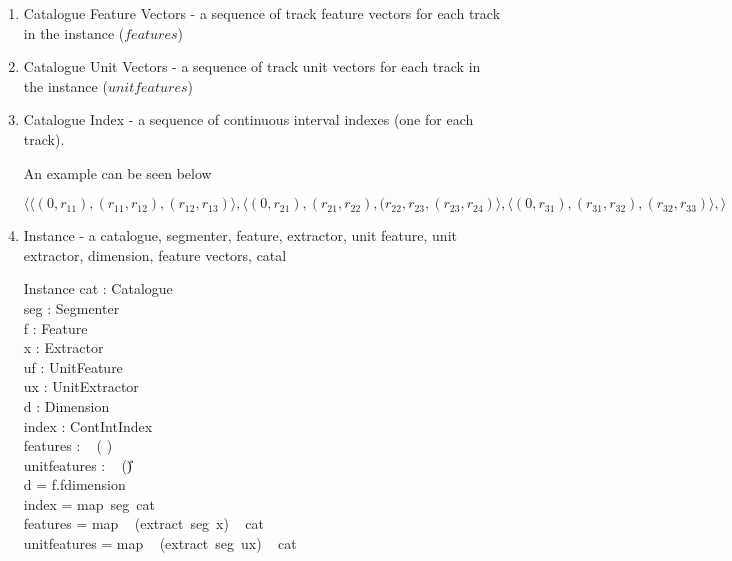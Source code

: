 \documentclass[11pt]{article}
\begin{document}
\begin{enumerate}
\item \textsf{Catalogue Feature Vectors}  - a sequence of track feature vectors for each track in the instance ($features$)

\item  \textsf{Catalogue Unit Vectors}  - a sequence of track unit vectors for each track in the instance ($unitfeatures$)

\item \textsf{Catalogue Index} - a sequence of continuous interval indexes (one for each track).

An example can be seen below

\[ \langle 
\langle (0,r_{11}), (r_{11},r_{12}), (r_{12}, r_{13}) \rangle, 
\langle (0,r_{21}), (r_{21},r_{22}), (r_{22}, r_{23}, (r_{23}, r_{24}) \rangle, 
\langle (0,r_{31}), (r_{31},r_{32}), (r_{32}, r_{33}) \rangle, 
\rangle \]

\item \textsf{Instance} - a catalogue, segmenter, feature, extractor, unit  feature, unit extractor, dimension, feature vectors, catal


\begin{schema}{Instance} 
	cat : Catalogue 				\\
	seg : Segmenter  			\\ 
	f : Feature 				\\  
	x : Extractor				\\			
	uf : UnitFeature			\\
	ux : UnitExtractor			\\
	d : Dimension 				\\
	index : \seq ContIntIndex \\
	features  :  \seq ~ (	\seq 	\V) \\
	unitfeatures : \seq ~ (\seq 	\U)  \\
\where
	d = f.fdimension \\
	index = map~seg~cat \\
	features = map ~ (extract~seg~x) ~ cat \\  
	unitfeatures =  map ~ (extract~seg~ux) ~ cat  \\     
\end{schema}	


\end{enumerate}
\end{document}
